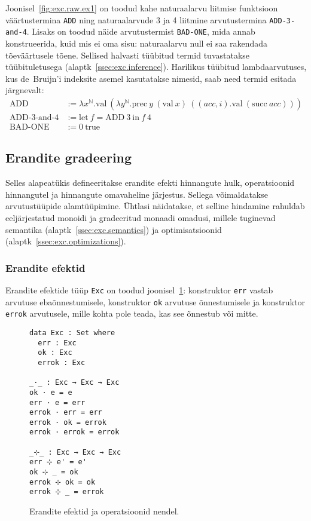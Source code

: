\documentclass[a4paper,12pt]{article}
\begin{document}
Joonisel~\ref{fig:exc.raw.ex1} on toodud kahe naturaalarvu liitmise funktsioon väärtustermina {\tt ADD}
ning naturaalarvude 3 ja 4 liitmine arvutustermina {\tt ADD-3-and-4}.
Lisaks on toodud näide arvutustermist {\tt BAD-ONE}, mida annab konstrueerida,
kuid mis ei oma sisu: naturaalarvu null ei saa rakendada tõeväärtusele tõene.
Sellised halvasti tüübitud termid tuvastatakse tüübituletusega (alaptk~\ref{ssec:exc.inference}).
Harilikus tüübitud lambdaarvutuses, kus de~Bruijn'i indeksite asemel kasutatakse nimesid, saab need termid esitada järgnevalt:
\begin{equation*}
\begin{split}
  \text{ADD} &:= \lambda x^\mathbb{N}.\text{val}~(\lambda y^\mathbb{N}.\text{prec}~y~ (\text{val}~x)~((acc,i).\text{val}~(\text{succ}~acc)))\\
  \text{ADD-3-and-4} &:= \text{let}~f=\text{ADD}~3~\text{in}~f~4\\
  \text{BAD-ONE} &:= 0~\text{true}
\end{split}
\end{equation*}


\subsection{Erandite gradeering}\label{ssec:exc.grading}

Selles alapeatükis defineeritakse erandite efekti hinnangute hulk, operatsioonid hinnangutel ja hinnangute omavaheline järjestus.
Sellega võimaldatakse arvutustüüpide alamtüüpimine.
Ühtlasi näidatakse, et selline hindamine rahuldab eeljärjestatud monoidi ja gradeeritud monaadi omadusi,
millele tuginevad semantika (alaptk~\ref{ssec:exc.semantics}) ja optimisatsioonid (alaptk~\ref{ssec:exc.optimizations}). 

\subsubsection{Erandite efektid}\label{sssec:exc.exc}

Erandite efektide tüüp {\tt Exc} on toodud joonisel~\ref{fig:exc.exc}:
konstruktor {\tt err} vastab arvutuse ebaõnnestumisele,
konstruktor {\tt ok} arvutuse õnnestumisele ja konstruktor {\tt errok} arvutusele,
mille kohta pole teada, kas see õnnestub või mitte.

\begin{figure}
  \begin{BVerbatim}
data Exc : Set where
  err : Exc
  ok : Exc
  errok : Exc

_·_ : Exc → Exc → Exc
ok · e = e
err · e = err
errok · err = err
errok · ok = errok
errok · errok = errok

_⊹_ : Exc → Exc → Exc
err ⊹ e' = e'
ok ⊹ _ = ok
errok ⊹ ok = ok
errok ⊹ _ = errok
  \end{BVerbatim}
  \caption{Erandite efektid ja operatsioonid nendel.}
  \label{fig:exc.exc}
\end{figure}
\end{document}
